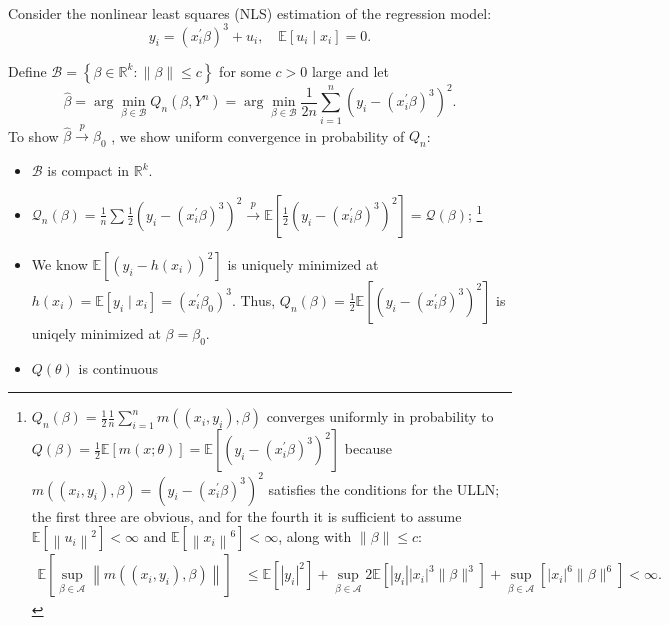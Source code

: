 \begin{eg}
    \

    Consider the nonlinear least squares (NLS) estimation of the regression model:
    \[y_{i}=\left(x_{i}^{\prime} \beta\right)^{3}+u_{i}, \quad \mathbb{E}\left[u_{i} \mid x_{i}\right]=0 .\]

    Define  $\mathscr{B}=\left\{\beta \in \mathbb{R}^{k}:\|\beta\| \leq c\right\}$ for some $c>0$ large and let
    \[
    \hat{\beta}=\arg \min _{\beta \in \mathscr{B}} Q_{n}\left(\beta, Y^{n}\right)=\arg \min _{\beta \in \mathcal{B}} \frac{1}{2 n} \sum_{i=1}^{n}\left(y_{i}-\left(x_{i}^{\prime} \beta\right)^{3}\right)^{2} .
    \]
    To show  $\hat{\beta} \xrightarrow{p} \beta_{0}$ , we show uniform convergence in probability of  $Q_{n}$:
    \begin{itemize}
        \item $\mathscr{B}$  is compact in $\mathbb{R}^{k}$.
        \item $\mathcal{Q}_n(\beta) = \frac{1}{n} \sum \frac{1}{2} \left(y_i - (x_i^{\prime} \beta)^3\right)^2 \overset{p}{\rightarrow} \mathbb{E}\left[\frac{1}{2} \left(y_i - (x_i^{\prime} \beta)^3\right)^2 \right] = \mathcal{Q} (\beta)$;
        \footnote{$Q_{n}(\beta)=\frac{1}{2} \frac{1}{n} \sum_{i=1}^{n} m\left(\left(x_{i}, y_{i}\right), \beta\right)$ converges uniformly in probability to 
        $Q(\beta)=\frac{1}{2} \mathbb{E}[m(x ; \theta)]=   \mathbb{E}\left[\left(y_{i}-\left(x_{i}^{\prime} \beta\right)^{3}\right)^{2}\right]$
        because $m\left(\left(x_{i}, y_{i}\right), \beta\right)=\left(y_{i}-\left(x_{i}^{\prime} \beta\right)^{3}\right)^{2}$  satisfies the conditions for the ULLN; 
        the first three are obvious, and for the fourth it is sufficient to assume $\mathbb{E}\left[\left\|u_{i}\right\|^{2}\right]<\infty$ and $\mathbb{E}\left[\left\|x_{i}\right\|^{6}\right]<\infty$, along with $\|\beta\| \leq c$:
        \begin{align*}
            \mathbb{E}\left[\sup _{\beta \in \mathscr{A}}\left\|m\left(\left(x_{i}, y_{i}\right), \beta\right)\right\|\right] &\leqslant \mathbb{E}\left[\left|y_{i}\right|^{2}\right]+\sup _{\beta \in \mathscr{A}} 2 \mathbb{E}\left[\left|y_{i}\right|\left|x_{i}\right|^{3}\|\beta\|^{3}\right]+\sup _{\beta \in \mathscr{A}}\left[\left|x_{i}\right|^{6}\|\beta\|^{6}\right] <\infty .
        \end{align*}
        }
        \item We know $\mathbb{E}\left[\left(y_{i}-h\left(x_{i}\right)\right)^{2}\right]$ is uniquely minimized at $h\left(x_{i}\right)=\mathbb{E}\left[y_{i} \mid x_{i}\right]=\left(x_{i}^{\prime} \beta_{0}\right)^{3}$.
        Thus, $Q_{n}(\beta)=\frac{1}{2} \mathbb{E}\left[\left(y_{i}-\left(x_{i}^{\prime} \beta\right)^{3}\right)^{2}\right]$ is uniqely minimized at $\beta=\beta_{0}$.
        \item $Q(\theta)$ is continuous
    \end{itemize}
\end{eg}

